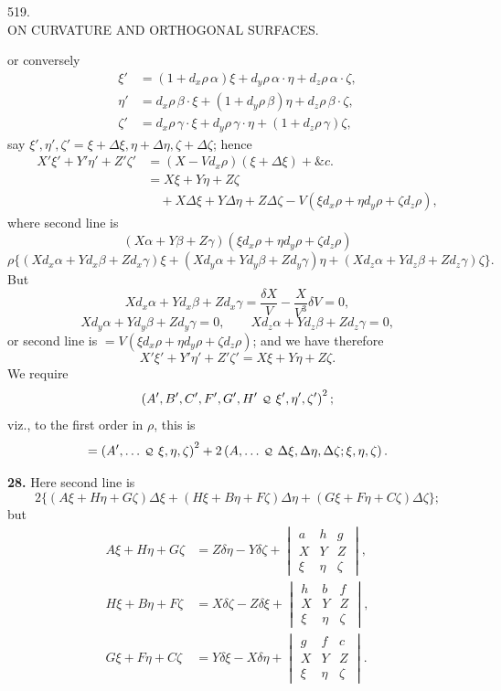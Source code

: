 \documentclass[11pt,a4paper]{article}
\newcommand{\cayq}{\mathbin{\raisebox{0.08ex}{\(\scriptstyle\mathcal Q\)}}}
\newcommand{\qf}[2]{\left(#1\,\cayq\,#2\right)^2}
\newcommand{\ql}[2]{\left(#1\,\cayq\,#2\right)}
\newcommand{\Dx}{d_x}
\newcommand{\Dy}{d_y}
\newcommand{\Dz}{d_z}
\newcommand{\V}{V}
\begin{document}
\begin{center}
{\Large 519.}\\[0.7em]
{\large ON CURVATURE AND ORTHOGONAL SURFACES.}
\end{center}

or conversely
\begin{align*}
\xi'  &=(1+\Dx\rho\,\alpha)\xi+\Dy\rho\,\alpha\cdot\eta+\Dz\rho\,\alpha\cdot\zeta,\\
\eta' &=\Dx\rho\,\beta\cdot\xi+(1+\Dy\rho\,\beta)\eta+\Dz\rho\,\beta\cdot\zeta,\\
\zeta'&=\Dx\rho\,\gamma\cdot\xi+\Dy\rho\,\gamma\cdot\eta+(1+\Dz\rho\,\gamma)\zeta,
\end{align*}
say \(\xi',\eta',\zeta'=\xi+\Delta\xi,\eta+\Delta\eta,\zeta+\Delta\zeta\); hence
\begin{align*}
X'\xi'+Y'\eta'+Z'\zeta'
&=(X-\V\Dx\rho)(\xi+\Delta\xi)+\&c.\\
&=X\xi+Y\eta+Z\zeta\\
&\quad +X\Delta\xi+Y\Delta\eta+Z\Delta\zeta
       -\V(\xi\Dx\rho+\eta\Dy\rho+\zeta\Dz\rho),
\end{align*}
where second line is
\[
(X\alpha+Y\beta+Z\gamma)(\xi\Dx\rho+\eta\Dy\rho+\zeta\Dz\rho)
\]
\[
\rho\{(X\Dx\alpha+Y\Dx\beta+Z\Dx\gamma)\xi
 +(X\Dy\alpha+Y\Dy\beta+Z\Dy\gamma)\eta
 +(X\Dz\alpha+Y\Dz\beta+Z\Dz\gamma)\zeta\}.
\]
But
\[
X\Dx\alpha+Y\Dx\beta+Z\Dx\gamma=\frac{\delta X}{V}-\frac{X}{V^3}\delta V=0,
\]
\[
X\Dy\alpha+Y\Dy\beta+Z\Dy\gamma=0,\qquad
X\Dz\alpha+Y\Dz\beta+Z\Dz\gamma=0,
\]
or second line is \(=\V(\xi\Dx\rho+\eta\Dy\rho+\zeta\Dz\rho)\); and we have therefore
\[
X'\xi'+Y'\eta'+Z'\zeta'=X\xi+Y\eta+Z\zeta.
\]
We require
\[
\qf{A',B',C',F',G',H'}{\xi',\eta',\zeta'} ;
\]
viz., to the first order in \(\rho\), this is
\[
=\qf{A',\ldots}{\xi,\eta,\zeta}
+2\ql{A,\ldots}{\Delta\xi,\Delta\eta,\Delta\zeta;\xi,\eta,\zeta}.
\]

\textbf{28.} Here second line is
\[
2\{(A\xi+H\eta+G\zeta)\Delta\xi+
(H\xi+B\eta+F\zeta)\Delta\eta+
(G\xi+F\eta+C\zeta)\Delta\zeta\};
\]
but
\begin{align*}
A\xi+H\eta+G\zeta
 &=Z\delta\eta-Y\delta\zeta+
\begin{vmatrix}
a&h&g\\ X&Y&Z\\ \xi&\eta&\zeta
\end{vmatrix},\\
H\xi+B\eta+F\zeta
 &=X\delta\zeta-Z\delta\xi+
\begin{vmatrix}
h&b&f\\ X&Y&Z\\ \xi&\eta&\zeta
\end{vmatrix},\\
G\xi+F\eta+C\zeta
 &=Y\delta\xi-X\delta\eta+
\begin{vmatrix}
g&f&c\\ X&Y&Z\\ \xi&\eta&\zeta
\end{vmatrix}.
\end{align*}
\end{document}
